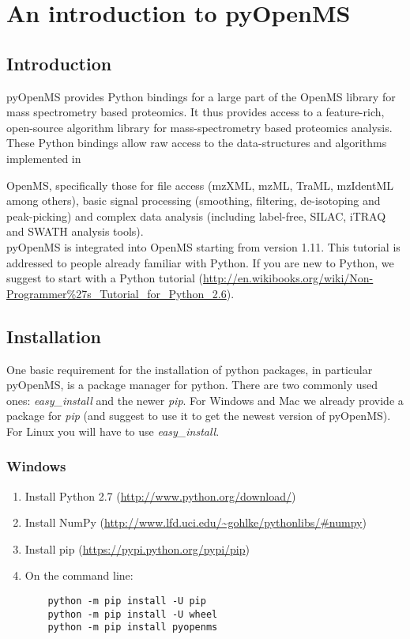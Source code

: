 
\newpage
\section{An introduction to pyOpenMS}

\subsection{Introduction}
pyOpenMS provides Python bindings for a large part of the OpenMS library for mass spectrometry based proteomics. It thus provides access to a feature-rich, open-source algorithm library for mass-spectrometry based proteomics analysis. These Python bindings allow raw access to the data-structures and algorithms implemented in {OpenMS, specifically those for file access (mzXML, mzML, TraML, mzIdentML among others), basic signal processing (smoothing, filtering, de-isotoping and peak-picking) and complex data analysis (including label-free, SILAC, iTRAQ and SWATH analysis tools).\\

pyOpenMS is integrated into OpenMS starting from version 1.11. This tutorial is addressed to people already familiar with Python. If you are new to Python, we suggest to start with a Python tutorial (\url{http://en.wikibooks.org/wiki/Non-Programmer%27s_Tutorial_for_Python_2.6}).

\subsection{Installation}
One basic requirement for the installation of python packages, in particular pyOpenMS, is a package manager for
python. There are two commonly used ones: \textit{easy\_install} and the newer \textit{pip}. For Windows and Mac we
already provide a package for \textit{pip} (and suggest to use it to get the newest version of pyOpenMS). For Linux you will have to use \textit{easy\_install}.
\subsubsection{Windows}
\begin{enumerate}
  \item Install Python 2.7 (\url{http://www.python.org/download/})
  \item Install NumPy (\url{http://www.lfd.uci.edu/~gohlke/pythonlibs/#numpy})
  \item Install pip (\url{https://pypi.python.org/pypi/pip})
  \item On the command line:
    \begin{lstlisting}
    python -m pip install -U pip
	python -m pip install -U wheel
	python -m pip install pyopenms
    \end{lstlisting}
\end{enumerate}

}

